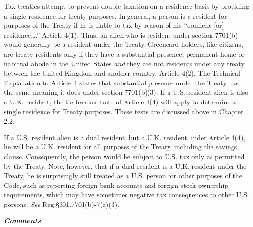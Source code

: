 Tax treaties attempt to prevent double taxation on a residence basis by providing a single residence for treaty purposes.  In general, a person is a resident for purposes of the Treaty if he is liable to tax by reason of his ``domicile [or] residence\ldots.'' Article 4(1).  Thus, an alien who is resident under section 7701(b) would generally be a resident under the Treaty.  Greencard holders, like citizens, are treaty residents only if they have a substantial presence, permanent home or habitual abode in the United States \emph{and} they are not residents under any treaty between the United Kingdom and another country.  Article 4(2).  The Technical Explanation to Article 4 states that substantial presence under the Treaty has the same meaning it does under section 7701(b)(3).  If a U.S. resident alien is also a U.K. resident, the tie-breaker tests of Article 4(4) will apply to determine a single residence for Treaty purposes.  These tests are discussed above in Chapter 2.2.

If a U.S. resident alien is a dual resident, but  a U.K. resident under Article 4(4), he will be a U.K. resident for all purposes of the Treaty, including the savings clause.  Consequently, the person would  be subject to U.S. tax only as permitted by the Treaty.  Note, however, that if a dual resident is a U.K. resident under the Treaty, he is surprisingly still treated as a U.S. person for other purposes of the Code, such as reporting foreign bank accounts and foreign stock ownership requirements, which may have sometimes negative tax consequences to other U.S. persons.  \emph{See} Reg.\@ \S301.7701(b)-7(a)(3).          


	\begin{center}
			\textbf{\emph{Comments}}
					\end{center}


